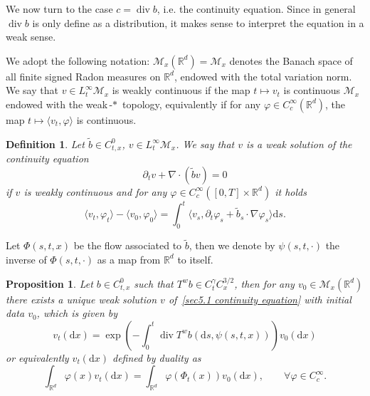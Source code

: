 \documentclass[10pt]{article}
\newcommand{\mathd}{\mathrm{d}}
\newcommand{\tmop}[1]{\ensuremath{\operatorname{#1}}}
\newtheorem{definition}{Definition}
\newtheorem{proposition}{Proposition}
{\theorembodyfont{\rmfamily}\newtheorem{remark}{Remark}}
\begin{document}
We now turn to the case $c = \tmop{div} b$, i.e. the continuity equation.
Since in general $\tmop{div} b$ is only define as a distribution, it makes
sense to interpret the equation in a weak sense.

We adopt the following notation: $\mathcal{M}_x (\mathbb{R}^d) =
\mathcal{M}_x$ denotes the Banach space of all finite signed Radon measures on
$\mathbb{R}^d$, endowed with the total variation norm. We say that $v \in
L^{\infty}_t \mathcal{M}_x$ is weakly continuous if the map $t \mapsto v_t$ is
continuous $\mathcal{M}_x$ endowed with the weak$\mbox{-}{\ast}$ topology,
equivalently if for any $\varphi \in C^{\infty}_c (\mathbb{R}^d)$, the map $t
\mapsto \langle v_t, \varphi \rangle$ is continuous.

\begin{definition}
  \label{sec5.1 defn continuity equation}Let $\tilde{b} \in C^0_{t, x}$, $v
  \in L^{\infty}_t \mathcal{M}_x$. We say that $v$ is a weak solution of the
  continuity equation
  \begin{equation}
    \partial_t v + \nabla \cdot (\tilde{b} v) = 0 \label{sec5.1 continuity
    equation}
  \end{equation}
  if $v$ is weakly continuous and for any $\varphi \in C^{\infty}_c ([0, T]
  \times \mathbb{R}^d)$ it holds
  \begin{equation}
    \langle v_t, \varphi_t \rangle - \langle v_0, \varphi_0 \rangle = \int_0^t
    \langle v_s, \partial_t \varphi_s + \tilde{b}_s \cdot \nabla \varphi_s
    \rangle \mathd s. \label{sec5.1 weak continuity equation}
  \end{equation}
\end{definition}

Let $\Phi (s, t, x)$ be the flow associated to $\tilde{b}$, then we denote by
$\psi (s, t, \cdot)$ the inverse of $\Phi (s, t, \cdot)$ as a map from
$\mathbb{R}^d$ to itself.

\begin{proposition}
  \label{sec5.1 thm continuity}Let $b \in C^0_{t, x}$ such that $T^w b \in
  C^{\gamma}_t C^{3 / 2}_x$, then for any $v_0 \in \mathcal{M}_x
  (\mathbb{R}^d)$ there exists a unique weak solution $v$ of~{\eqref{sec5.1
  continuity equation}} with initial data $v_0$, which is given by
  \begin{equation}
    v_t (\mathd x) = \exp \left( - \int_0^t \tmop{div} T^w b (\mathd s, \psi
    (s, t, x)) \right) v_0 (\mathd x) \label{sec5.1 solution continuity ugly}
  \end{equation}
  or equivalently $v_t (\mathd x)$ defined by duality as
  \begin{equation}
    \int_{\mathbb{R}^d} \varphi (x) v_t (\mathd x) = \int_{\mathbb{R}^d}
    \varphi (\Phi_t (x)) v_0 (\mathd x), \qquad \forall \varphi \in
    C^{\infty}_c . \label{sec5.1 solution continuity eq}
  \end{equation}
\end{proposition}
\end{document}
